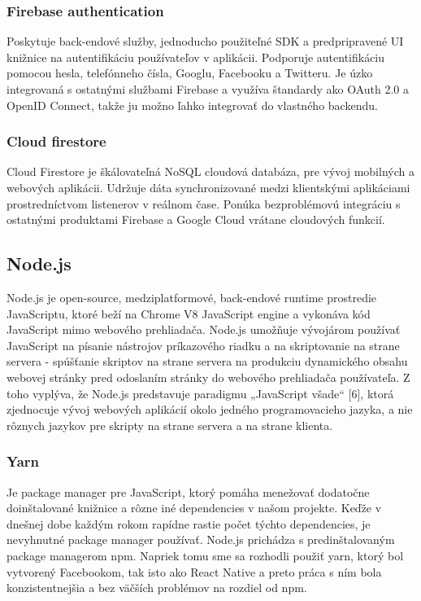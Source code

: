 \subsubsection{Firebase authentication}
Poskytuje back-endové služby, jednoducho použiteľné SDK a predpripravené UI knižnice na autentifikáciu používateľov v aplikácii. Podporuje autentifikáciu pomocou hesla, telefónneho čísla, Googlu, Facebooku a Twitteru. Je úzko integrovaná s ostatnými službami Firebase a využíva  štandardy ako OAuth 2.0 a OpenID Connect, takže ju možno ľahko integrovať do vlastného backendu.
\subsubsection{Cloud firestore}
Cloud Firestore je škálovateľná NoSQL cloudová databáza, pre vývoj mobilných a webových aplikácii. Udržuje dáta synchronizované medzi klientskými aplikáciami prostredníctvom listenerov v reálnom čase. Ponúka bezproblémovú integráciu s ostatnými produktami Firebase a Google Cloud vrátane cloudových funkcií.
\subsection{Node.js}
Node.js je open-source, medziplatformové, back-endové runtime prostredie JavaScriptu, ktoré beží na Chrome V8 JavaScript engine a vykonáva kód JavaScript mimo webového prehliadača. Node.js umožňuje vývojárom používať JavaScript na písanie nástrojov príkazového riadku a na skriptovanie na strane servera - spúšťanie skriptov na strane servera na produkciu dynamického obsahu webovej stránky pred odoslaním stránky do webového prehliadača používateľa. Z toho vyplýva, že Node.js predstavuje paradigmu „JavaScript všade“ [6], ktorá zjednocuje vývoj webových aplikácií okolo jedného programovacieho jazyka, a nie rôznych jazykov pre skripty na strane servera a na strane klienta.
\subsubsection{Yarn}
Je package manager pre JavaScript, ktorý pomáha menežovať dodatočne doinštalované knižnice a rôzne iné dependencies v našom projekte. Keďže v dnešnej dobe každým rokom rapídne rastie počet týchto dependencies, je nevyhnutné package manager používať. Node.js prichádza s predinštalovaným package managerom npm. Napriek tomu sme sa rozhodli použiť yarn, ktorý bol vytvorený Facebookom, tak isto ako React Native a preto práca s ním bola konzistentnejšia a bez väčších problémov na rozdiel od npm. 
